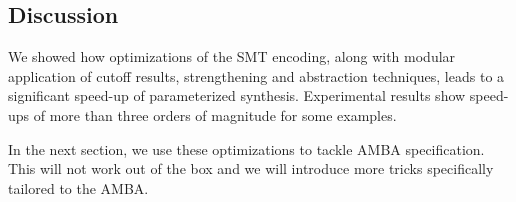 



\subsection{Discussion}

We showed how optimizations of the SMT encoding, along with modular application of cutoff results, strengthening and abstraction techniques, leads to a significant speed-up of parameterized synthesis. Experimental results show speed-ups of more than three orders of magnitude for some examples.


In the next section,
we use these optimizations to tackle AMBA specification.
This will not work out of the box and we will introduce more tricks specifically tailored to the AMBA.

